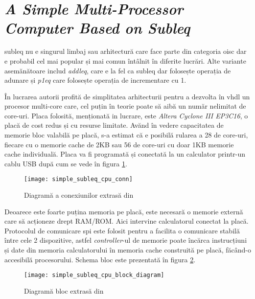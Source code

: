 \documentclass[../main.tex]{subfiles}
\begin{document}
\section{\emph{A Simple Multi-Processor Computer Based on Subleq}}
\acrshort{subleq} nu e singurul limbaj sau arhitectură care face parte din categoria \acrshort{oisc}
dar e probabil cel mai popular și mai comun întâlnit în diferite lucrări. Alte variante
asemănătoare includ \emph{\acrfull{addleq}}, care e la fel ca \acrshort{subleq} dar folosește operația
de adunare și \emph{\acrfull{p1eq}} care folosește operația de incrementare cu 1.

În lucrarea \cite{subleqcpu} autorii profită de simplitatea arhitecturii pentru a dezvolta în \acrshort{vhdl} un procesor
multi-core care, cel puțin în teorie poate să aibă un număr nelimitat de core-uri. Placa folosită, menționată in lucrare,
este \emph{Altera Cyclone III EP3C16}, o placă de cost redus și cu resurse limitate. Avănd în vedere capacitatea de
memorie bloc valabilă pe placă, s-a estimat că e posibilă rularea a 28 de core-uri, fiecare cu o memorie cache de 2KB
sau 56 de core-uri cu doar 1KB memorie cache individuală. Placa va fi programată și conectată la un calculator printr-un
cablu USB după cum se vede în figura \ref{fig:simple_subleq_cpu_conn}.

\begin{figure}[h]
    \centering
    \texttt{[image: simple\_subleq\_cpu\_conn]}
    \caption{Diagramă a conexiunilor extrasă din \cite{subleqcpu}}
    \label{fig:simple_subleq_cpu_conn}
\end{figure}

Deoarece este foarte puțina memoria pe placă, este necesară o memorie externă care să acționeze drept RAM/ROM.
Aici intervine calculatorul conectat la placă. Protocolul de comunicare \acrshort{spi} este folosit pentru a
facilita o comunicare stabilă între cele 2 dispozitive, astfel \emph{controller}-ul de memorie poate încărca
instrucțiuni și date din memoria calculatorului în memoria cache construită pe placă, făcând-o accesibilă
procesorului. Schema bloc este prezentată în figura \ref{fig:simple_subleq_cpu_block_diagram}.

\begin{figure}[h]
    \centering
    \texttt{[image: simple\_subleq\_cpu\_block\_diagram]}
    \caption{Diagramă bloc extrasă din \cite{subleqcpu}}
    \label{fig:simple_subleq_cpu_block_diagram}
\end{figure}
\end{document}
